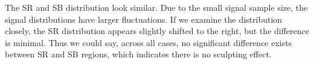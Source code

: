 \documentclass[12pt]{article}
\begin{document}
		The SR and SB distribution look similar. Due to the small signal sample size, the signal distributions have larger fluctuations. If we examine the distribution closely, the SR distribution appears slightly shifted to the right, but the difference is minimal. Thus we could say, across all cases, no significant difference exists between SR and SB regions, which indicates there is no sculpting effect. 
		\begin{figure}[htpb]
			\centering
			 \\
\end{figure}
\end{document}
